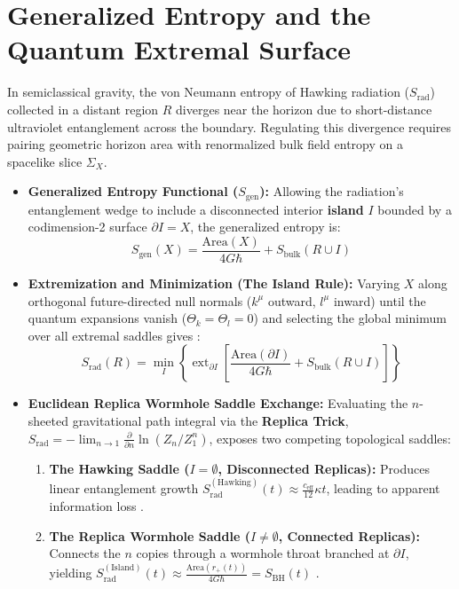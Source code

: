 \documentclass[11pt,a4paper]{article}
\begin{document}
\section{Generalized Entropy and the Quantum Extremal Surface}

In semiclassical gravity, the von Neumann entropy of Hawking radiation ($S_{\text{rad}}$) collected in a distant region $R$ diverges near the horizon due to short-distance ultraviolet entanglement across the boundary. Regulating this divergence requires pairing geometric horizon area with renormalized bulk field entropy on a spacelike slice $\Sigma_X$.

\begin{itemize}
\item \textbf{Generalized Entropy Functional ($S_{\text{gen}}$):} Allowing the radiation's entanglement wedge to include a disconnected interior \textbf{island} $I$ bounded by a codimension-2 surface $\partial I = X$, the generalized entropy is:
\begin{equation}
S_{\text{gen}}(X) = \frac{\text{Area}(X)}{4 G \hbar} + S_{\text{bulk}}(R \cup I)
\end{equation}

\item \textbf{Extremization and Minimization (The Island Rule):} Varying $X$ along orthogonal future-directed null normals ($k^\mu$ outward, $l^\mu$ inward) until the quantum expansions vanish ($\Theta_k = \Theta_l = 0$) and selecting the global minimum over all extremal saddles gives \cite{AEMM2019,Penington2020}:
\begin{equation}
S_{\text{rad}}(R) = \min_I \left\{ \operatorname{ext}_{\partial I} \left[ \frac{\text{Area}(\partial I)}{4 G \hbar} + S_{\text{bulk}}(R \cup I) \right] \right\}
\end{equation}

\item \textbf{Euclidean Replica Wormhole Saddle Exchange:} Evaluating the $n$-sheeted gravitational path integral via the \textbf{Replica Trick}, $S_{\text{rad}} = -\lim_{n \to 1} \frac{\partial}{\partial n} \ln (Z_n / Z_1^n)$, exposes two competing topological saddles:
\begin{enumerate}
\item \textbf{The Hawking Saddle ($I = \emptyset$, Disconnected Replicas):} Produces linear entanglement growth $S_{\text{rad}}^{(\text{Hawking})}(t) \approx \frac{c_{\text{eff}}}{12} \kappa t$, leading to apparent information loss \cite{Hawking1975,Page1993}.
\item \textbf{The Replica Wormhole Saddle ($I \neq \emptyset$, Connected Replicas):} Connects the $n$ copies through a wormhole throat branched at $\partial I$, yielding $S_{\text{rad}}^{(\text{Island})}(t) \approx \frac{\text{Area}(r_+(t))}{4 G \hbar} = S_{\text{BH}}(t)$ \cite{AEMM2019,Penington2020}.
\end{enumerate}
\end{itemize}
\end{document}
